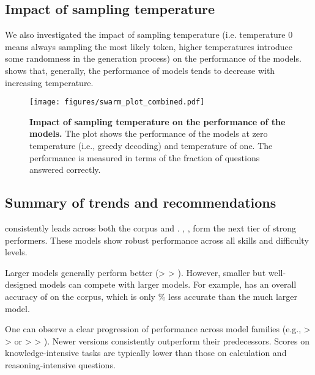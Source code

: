 \clearpage
\subsection{Impact of sampling temperature}
We also investigated the impact of sampling temperature (i.e. temperature 0 means always sampling the most likely token, higher temperatures introduce some randomness in the generation process) on the performance of the models.  shows that, generally, the performance of models tends to decrease with increasing temperature.

\begin{figure}[!h]
    \centering
    \texttt{[image: figures/swarm\_plot\_combined.pdf]}
    \caption{\textbf{Impact of sampling temperature on the performance of the models.} The plot shows the performance of the models at zero temperature (i.e., greedy decoding) and temperature of one. The performance is measured in terms of the fraction of questions answered correctly.}
    \label{fig:temperature_impact}
\end{figure}


\clearpage
\subsection{Summary of trends and recommendations}

\oone consistently leads across both the \chembench corpus and \chembenchmini.  \ClaudeThreeFiveSonnet, \GPTFourO, \LlamaThreeOneFourZeroFiveBInstruct form the next tier of strong performers. These models show robust performance across all skills and difficulty levels.

Larger models generally perform better (\LlamaThreeOneFourZeroFiveBInstruct > \LlamaThreeOneSeventyBInstruct > \LlamaThreeOneEightBInstruct). However, smaller but well-designed models can compete with larger models. For example, \GemmaTwoNineBIt has an overall accuracy of  on the \chembench corpus, which is only \% less accurate than the much larger \LlamaThreeOneFourZeroFiveBInstruct model.

One can observe a clear progression of performance across model families (e.g., \ClaudeThreeFiveSonnet >  \ClaudeThree > \ClaudeTwo or \GPTFourO > \GPTFour > \GPTThreeFiveTurboZeroT). Newer versions consistently outperform their predecessors.
Scores on knowledge-intensive tasks are typically lower than those on calculation and reasoning-intensive questions.

